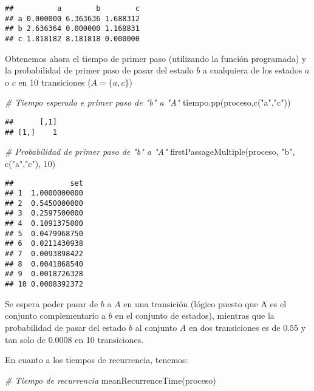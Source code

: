\documentclass[
]{book}
\newenvironment{Shaded}{\begin{snugshade}}{\end{snugshade}}
\newcommand{\CommentTok}[1]{\textcolor[rgb]{0.56,0.35,0.01}{\textit{#1}}}
\newcommand{\DecValTok}[1]{\textcolor[rgb]{0.00,0.00,0.81}{#1}}
\newcommand{\FunctionTok}[1]{\textcolor[rgb]{0.00,0.00,0.00}{#1}}
\newcommand{\NormalTok}[1]{#1}
\newcommand{\StringTok}[1]{\textcolor[rgb]{0.31,0.60,0.02}{#1}}
\theoremstyle{definition}
\theoremstyle{definition}
\theoremstyle{definition}
\theoremstyle{definition}
\theoremstyle{remark}
\begin{document}
\begin{verbatim}
##          a        b        c
## a 0.000000 6.363636 1.688312
## b 2.636364 0.000000 1.168831
## c 1.818182 8.181818 0.000000
\end{verbatim}

Obtenemos ahora el tiempo de primer paso (utilizando la función programada) y la probabilidad de primer paso de pasar del estado \(b\) a cualquiera de los estados \(a\) o \(c\) en 10 transiciones (\(A = \{a, c\}\))

\begin{Shaded}
\begin{Highlighting}[]
\CommentTok{\# Tiempo esperado e primer paso de "b" a "A"}
\FunctionTok{tiempo.pp}\NormalTok{(proceso,}\FunctionTok{c}\NormalTok{(}\StringTok{"a"}\NormalTok{,}\StringTok{"c"}\NormalTok{))}
\end{Highlighting}
\end{Shaded}

\begin{verbatim}
##      [,1]
## [1,]    1
\end{verbatim}

\begin{Shaded}
\begin{Highlighting}[]
\CommentTok{\# Probabilidad de primer paso de "b" a "A"}
\FunctionTok{firstPassageMultiple}\NormalTok{(proceso, }\StringTok{"b"}\NormalTok{, }\FunctionTok{c}\NormalTok{(}\StringTok{"a"}\NormalTok{,}\StringTok{"c"}\NormalTok{), }\DecValTok{10}\NormalTok{)}
\end{Highlighting}
\end{Shaded}

\begin{verbatim}
##             set
## 1  1.0000000000
## 2  0.5450000000
## 3  0.2597500000
## 4  0.1091375000
## 5  0.0479968750
## 6  0.0211430938
## 7  0.0093898422
## 8  0.0041868540
## 9  0.0018726328
## 10 0.0008392372
\end{verbatim}

Se espera poder pasar de \(b\) a \(A\) en una transición (lógico puesto que A es el conjunto complementario a \(b\) en el conjunto de estados), mientras que la probabilidad de pasar del estado \(b\) al conjunto \(A\) en dos transiciones es de \(0.55\) y tan solo de \(0.0008\) en 10 transiciones.

En cuanto a los tiempos de recurrencia, tenemos:

\begin{Shaded}
\begin{Highlighting}[]
\CommentTok{\# Tiempo de recurrencia}
\FunctionTok{meanRecurrenceTime}\NormalTok{(proceso)}
\end{Highlighting}
\end{Shaded}
\end{document}
